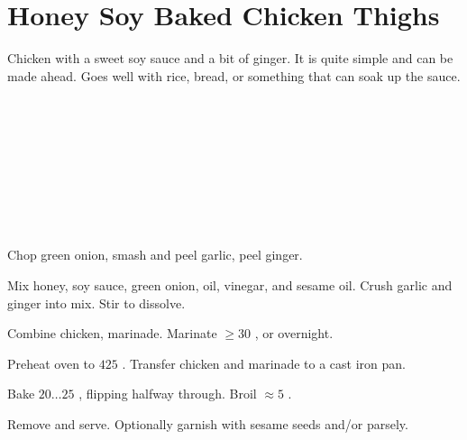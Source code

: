\section[Honey Soy Chicken]{
    Honey Soy Baked Chicken Thighs
}


\begin{recipestats}[
        servings=2,
        preptime=15 \minute,
        bakingtime=35 \minute,
        source=Pamela Teresi,
    ]
\end{recipestats}

\begin{recipeabstract}
    Chicken with a sweet soy sauce and a bit of ginger.
    It is quite simple and can be made ahead.
    Goes well with rice, bread, or something that can soak up the sauce.
\end{recipeabstract}

\begin{ingredientcolumns}
    \begin{ingredientblock}
        \\
        \\
        \\
        \\
    \end{ingredientblock}
    \begin{ingredientblock}
        \\
        \\
        \\
    \end{ingredientblock}
\end{ingredientcolumns}

\begin{preparation}
\item Chop green onion, smash and peel garlic, peel ginger.

\item Mix honey, soy sauce, green onion, oil, vinegar, and sesame oil.
    Crush garlic and ginger into mix.
    Stir to dissolve.

\item Combine chicken, marinade.
    Marinate $\ge30$ \minute, or overnight.

\item Preheat oven to $425$ \Fahrenheit.
    Transfer chicken and marinade to a cast iron pan.

\item Bake $20 \dots 25$ \minute, flipping halfway through.
    Broil $\approx5$ \minute.

\item Remove and serve.
    Optionally garnish with sesame seeds and/or parsely.

\end{preparation}

\recipeend%
